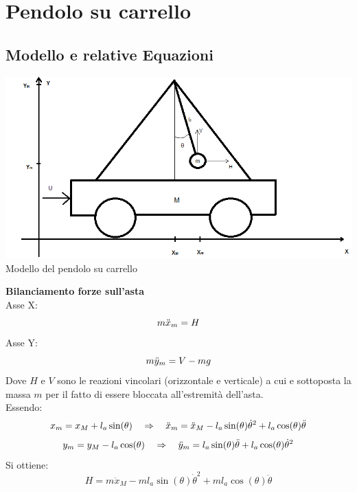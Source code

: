 \chapter{Pendolo su carrello}
\section{Modello e relative Equazioni}

\begin{center}
	\includegraphics[scale=0.75]{pendolo.png}\\
	{\small  Modello del pendolo su carrello}\\
\end{center}
\textbf{Bilanciamento forze sull'asta}\\
Asse X:
\begin{equation}\notag
m\ddot{x}_m=H
\end{equation}
Asse Y:
\begin{equation}\notag
m\ddot{y}_m=V-mg
\end{equation}
Dove $H$ e $V$ sono le reazioni vincolari (orizzontale e verticale) a cui e sottoposta la massa $m$ per il fatto di essere bloccata all'estremità dell'asta.\\ 
Essendo:\\
\begin{equation}\notag
x_m = x_M+l_a\sin(\theta) \quad \Rightarrow \quad \ddot{x}_m=\ddot{x}_M-l_a\sin(\theta)\dot{\theta}^2+l_a\cos(\theta)\ddot{\theta}
\end{equation}
\begin{equation}\notag
y_m=y_M-l_a\cos(\theta) \quad \Rightarrow \quad \ddot{y}_m=l_a\sin(\theta)\ddot{\theta}+l_a\cos(\theta)\dot{\theta}^2
\end{equation}
Si ottiene:
\begin{equation}\label{Hv}
H=m\ddot{x}_M-ml_a\sin(\theta)\dot{\theta}^2+ml_a\cos(\theta)\ddot{\theta}
\end{equation}
